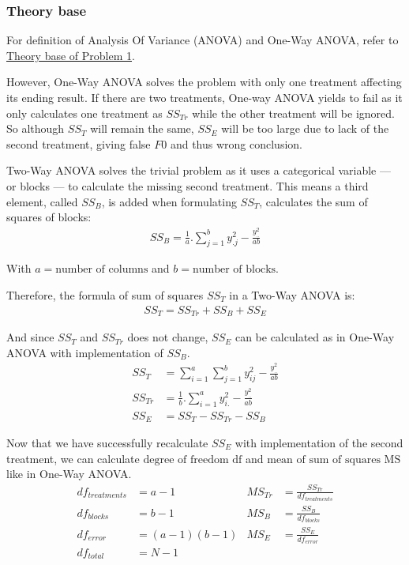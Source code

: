 \documentclass[a4paper]{article}
\numberwithin{equation}{section}
\begin{document}
\subsubsection{Theory base}
For definition of Analysis Of Variance (ANOVA) and One-Way ANOVA, refer to \hyperref[anovaDef]{\underline{Theory base of Problem 1}}.

However, One-Way ANOVA solves the problem with only one treatment affecting its ending result. If there are two treatments, One-way ANOVA yields to fail as it only calculates one treatment as \(SS_{Tr}\) while the other treatment will be ignored. So although \(SS_{T}\) will remain the same, \(SS_{E}\) will be too large due to lack of the second treatment, giving false \(F0\) and thus wrong conclusion.

Two-Way ANOVA solves the trivial problem as it uses a categorical variable --- or blocks --- to calculate the missing second treatment. This means a third element, called \(SS_{B}\), is added when formulating \(SS_{T}\),  calculates the sum of squares of blocks:
\begin{align*}
  SS_{B} = \frac{1}{a}.\sum_{j=1}^{b}y^2_{.j} - \frac{y^2_{..}}{ab}
\end{align*}

With \(a = \text{number of columns}\) and \(b = \text{number of blocks}\).

Therefore, the formula of sum of squares \(SS_{T}\) in a Two-Way ANOVA is:
\begin{align*}
  SS_{T} = SS_{Tr} + SS_{B} + SS_{E}
\end{align*}

And since \(SS_{T}\) and \(SS_{Tr}\) does not change, \(SS_{E}\) can be calculated as in One-Way ANOVA with implementation of \(SS_{B}\).
\begin{align*}
  SS_{T}  & = \sum_{i=1}^{a}\sum_{j=1}^{b}y^2_{ij} - \frac{y^2_{..}}{ab} \\
  SS_{Tr} & = \frac{1}{b}.\sum_{i=1}^{a}y^2_{i.} - \frac{y^2_{..}}{ab}   \\
  SS_{E}  & = SS_{T} - SS_{Tr} - SS_{B}
\end{align*}

Now that we have successfully recalculate \(SS_{E}\) with implementation of the second treatment, we can calculate \(\text{degree of freedom df}\) and \(\text{mean of sum of  squares MS}\) like in One-Way ANOVA.\
\begin{align*}
  df_{treatments} & = a - 1      & MS_{Tr} & = \frac{SS_{Tr}}{df_{treatments}} \\
  df_{blocks}     & = b - 1      & MS_{B}  & = \frac{SS_{B}}{df_{blocks}}      \\
  df_{error}      & = (a-1)(b-1) & MS_{E}  & = \frac{SS_{E}}{df_{error}}       \\
  df_{total}      & = N-1
\end{align*}
\end{document}

